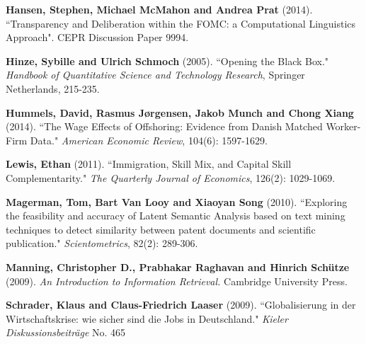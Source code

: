 \documentclass[11pt,a4paper,fleqn]{article}
\begin{document}
\begin{thebibliography}{9}
	 \textbf{Hansen, Stephen, Michael McMahon and Andrea Prat} (2014). ``Transparency and Deliberation within the FOMC:
a Computational Linguistics Approach". CEPR Discussion Paper 9994.

	 \textbf{Hinze, Sybille and Ulrich Schmoch} (2005). ``Opening the Black Box." \textit{Handbook of Quantitative Science and Technology Research}, Springer Netherlands, 215-235.
	
	 \textbf{Hummels, David, Rasmus Jørgensen, Jakob Munch and Chong Xiang} (2014). ``The Wage Effects of Offshoring: Evidence from Danish Matched Worker-Firm Data." \textit{American Economic Review}, 104(6): 1597-1629.
	
	 \textbf{Lewis, Ethan} (2011). ``Immigration, Skill Mix, and Capital Skill Complementarity." \textit{The Quarterly Journal of Economics}, 126(2): 1029-1069.
	
	
	 \textbf{Magerman, Tom, Bart Van Looy and Xiaoyan Song} (2010). ``Exploring the feasibility and accuracy of Latent Semantic Analysis based on text mining techniques to detect similarity between patent documents and scientific publication." \textit{Scientometrics}, 82(2): 289-306.	

	 \textbf{Manning, Christopher D., Prabhakar Raghavan and Hinrich Schütze} (2009). \textit{An Introduction to Information Retrieval.}  Cambridge University Press.
	
	 \textbf{Schrader, Klaus and Claus-Friedrich Laaser} (2009). ``Globalisierung in der Wirtschaftskrise: wie sicher sind die Jobs in Deutschland." \textit{Kieler Diskussionsbeiträge} No. 465
	
		
\end{thebibliography}





\end{document}
